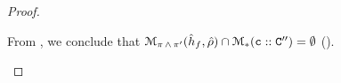 \begin{proof}
\begin{itemize}
              
              From , we conclude that 
              $\smodels{\sheap_f, \sstore}{\pc \, \wedge \, \pc'} \cap \sepmodels{\cell \lstcons \cells''} = \emptyset$ ().
\end{itemize}
\end{proof} 


%


% 
 
% 
 
